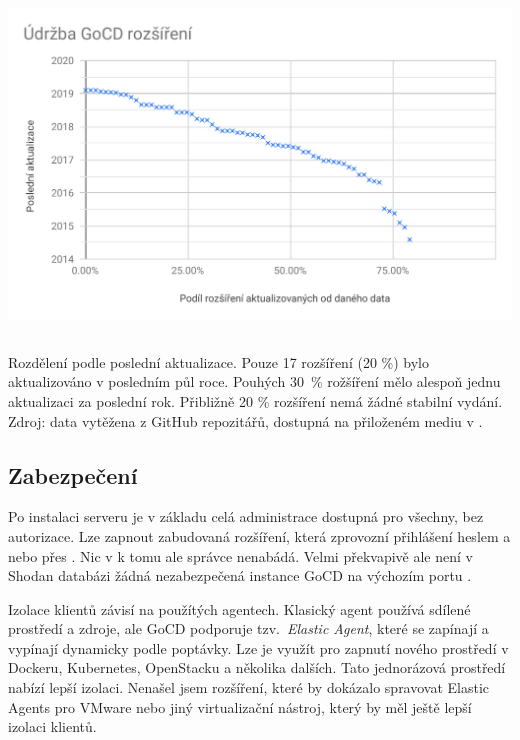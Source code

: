         \begin{iffigure}
            \centering
            \includegraphics[width=\textwidth,height=9cm,keepaspectratio]{media/go-plugins-update.pdf}
            \caption{Rozdělení podle poslední aktualizace. Pouze 17 rozšíření (20 \%) bylo aktualizováno v posledním půl roce. Pouhých 30~\% rožšíření mělo alespoň jednu aktualizaci za poslední rok. Přibližně 20 \% rozšíření nemá žádné stabilní vydání. Zdroj: data vytěžena z GitHub repozitářů, dostupná na přiloženém mediu v .}
            \label{fig:jenkins-plugins}
        \end{iffigure}

    \subsection{Zabezpečení}
        Po instalaci serveru je v základu celá administrace dostupná pro všechny, bez autorizace. Lze zapnout zabudovaná rozšíření, která zprovozní přihlášení heslem a nebo přes . Nic v  k tomu ale správce nenabádá. Velmi překvapivě ale není v Shodan databázi žádná nezabezpečená instance GoCD na výchozím portu \cite{shodan-gocd}.

        Izolace klientů závisí na použítých agentech. Klasický agent používá sdílené prostředí a zdroje, ale GoCD podporuje tzv.~\textit{Elastic Agent}, které se zapínají a vypínají dynamicky podle poptávky. Lze je využít pro zapnutí nového prostředí v Dockeru, Kubernetes, OpenStacku a několika dalších. Tato jednorázová prostředí nabízí lepší izolaci. Nenašel jsem rozšíření, které by dokázalo spravovat Elastic Agents pro VMware nebo jiný virtualizační nástroj, který by měl ještě lepší izolaci klientů.

